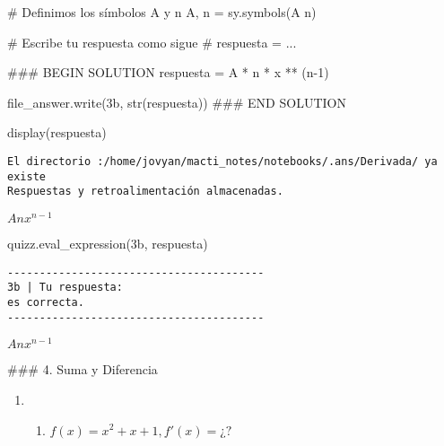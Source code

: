 \documentclass[
  letterpaper,
  DIV=11,
  numbers=noendperiod]{scrreprt}
\newenvironment{Shaded}{\begin{snugshade}}{\end{snugshade}}
\newcommand{\BuiltInTok}[1]{\textcolor[rgb]{0.00,0.23,0.31}{#1}}
\newcommand{\CommentTok}[1]{\textcolor[rgb]{0.37,0.37,0.37}{#1}}
\newcommand{\DecValTok}[1]{\textcolor[rgb]{0.68,0.00,0.00}{#1}}
\newcommand{\NormalTok}[1]{\textcolor[rgb]{0.00,0.23,0.31}{#1}}
\newcommand{\OperatorTok}[1]{\textcolor[rgb]{0.37,0.37,0.37}{#1}}
\newcommand{\RegionMarkerTok}[1]{\textcolor[rgb]{0.00,0.23,0.31}{#1}}
\newcommand{\StringTok}[1]{\textcolor[rgb]{0.13,0.47,0.30}{#1}}
\providecommand{\tightlist}{%
  \setlength{\itemsep}{0pt}\setlength{\parskip}{0pt}}\usepackage{longtable,booktabs,array}
\begin{document}
\begin{Shaded}
\begin{Highlighting}[]
\CommentTok{\# Definimos los símbolos A y n}
\NormalTok{A, n }\OperatorTok{=}\NormalTok{ sy.symbols(}\StringTok{\textquotesingle{}A n\textquotesingle{}}\NormalTok{)}

\CommentTok{\# Escribe tu respuesta como sigue }
\CommentTok{\# respuesta = ...}

\CommentTok{\#\#\# }\RegionMarkerTok{BEGIN}\CommentTok{ SOLUTION}
\NormalTok{respuesta }\OperatorTok{=}\NormalTok{ A }\OperatorTok{*}\NormalTok{ n }\OperatorTok{*}\NormalTok{ x }\OperatorTok{**}\NormalTok{ (n}\OperatorTok{{-}}\DecValTok{1}\NormalTok{)}

\NormalTok{file\_answer.write(}\StringTok{\textquotesingle{}3b\textquotesingle{}}\NormalTok{, }\BuiltInTok{str}\NormalTok{(respuesta))}
\CommentTok{\#\#\# }\RegionMarkerTok{END}\CommentTok{ SOLUTION}

\NormalTok{display(respuesta)}
\end{Highlighting}
\end{Shaded}

\begin{verbatim}
El directorio :/home/jovyan/macti_notes/notebooks/.ans/Derivada/ ya existe
Respuestas y retroalimentación almacenadas.
\end{verbatim}

$\displaystyle A n x^{n - 1}$

\begin{Shaded}
\begin{Highlighting}[]
\NormalTok{quizz.eval\_expression(}\StringTok{\textquotesingle{}3b\textquotesingle{}}\NormalTok{, respuesta)}
\end{Highlighting}
\end{Shaded}

\begin{verbatim}
----------------------------------------
3b | Tu respuesta:
es correcta.
----------------------------------------
\end{verbatim}

$\displaystyle A n x^{n - 1}$

\#\#\# 4. Suma y Diferencia

\begin{enumerate}
\def\labelenumi{\arabic{enumi}.}
\setcounter{enumi}{3}
\tightlist
\item
  \begin{enumerate}
  \def\labelenumii{\alph{enumii}.}
  \tightlist
  \item
    \(f(x) = x^{2}+x+1, f'(x) = ¿?\)
  \end{enumerate}
\end{enumerate}
\end{document}
